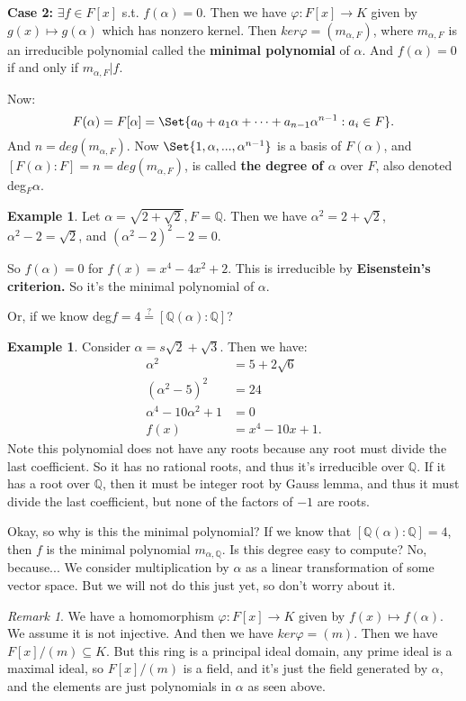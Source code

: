 \documentclass[9pt,reqno,twoside]{amsbook}
\theoremstyle{plain}
\numberwithin{section}{chapter}
\numberwithin{equation}{chapter}
\theoremstyle{definition}
\newtheorem{Ex}[theorem]{Example}
\theoremstyle{remark}
\newtheorem{rem}[theorem]{Remark}
\theoremstyle{plain}
\newcommand{\sub}{\subseteq}
\newcommand{\Q}{\mathbb{Q}}
\newcommand{\bee}{\begin{equation}\begin{aligned}}
\newcommand{\eee}{\end{aligned}\end{equation}}
\renewcommand{\phi}{\varphi}
\begin{document}
\textbf{Case 2: } $\exists f \in F[x]$ s.t. $f(\alpha) = 0$. Then we have $\phi:F[x] \to K$ given by $g(x) \mapsto g(\alpha)$ which has nonzero kernel. Then $ker\phi = (m_{\alpha,F})$, where $m_{\alpha,F}$ is an irreducible polynomial called the \textbf{minimal polynomial} of $\alpha$. And $f(\alpha) = 0$ if and only if $m_{\alpha,F}|f$. 

Now:
$$
F(\alpha) = F[\alpha] = \Set{a_0 + a_1\alpha + \cdots + a_{n - 1}\alpha^{n  -1}:a_i \in F}.
$$
And $n = deg(m_{\alpha,F})$. Now $\Set{1,\alpha,...,\alpha^{n - 1}}$ is a basis of $F(\alpha)$, and $[F(\alpha):F] = n = deg(m_{\alpha,F})$, is called \textbf{the degree of $\alpha$} over $F$, also denoted deg$_F\alpha$. 

\begin{Ex}
Let $\alpha = \sqrt{2 + \sqrt{2}}, F = \Q$. Then we have $\alpha^2 = 2 + \sqrt{2}$, $\alpha^2 - 2 = \sqrt{2}$, and $(\alpha^2 - 2)^2  - 2 = 0$. 

So $f(\alpha) = 0$ for $f(x) = x^4 - 4x^2 + 2$. This is irreducible by \textbf{Eisenstein's criterion.} So it's the minimal polynomial of $\alpha$. 

Or, if we know deg$f = 4 \overset{?}{=}[\Q(\alpha):\Q]$? 
\end{Ex}

\begin{Ex}
Consider $\alpha = s\sqrt{2} + \sqrt{3}$. Then we have:
\bee
\alpha^2 &= 5 + 2\sqrt{6}\\
(\alpha^2 - 5)^2 &= 24\\
\alpha^4 - 10 \alpha^2 + 1 &= 0\\
f(x) &= x^4 - 10x + 1.
\eee
Note this polynomial does not have any roots because any root must divide the last coefficient. So it has no rational roots, and thus it's irreducible over $\Q$. If it has a root over $\Q$, then it must be integer root  by Gauss lemma, and thus it must divide the last coefficient, but none of the factors of $-1$ are roots. 

Okay, so why is this the minimal polynomial? If we know that $[\Q(\alpha):\Q] = 4$, then $f$ is the minimal polynomial $m_{\alpha,\Q}$. Is this degree easy to compute? No, because... We consider multiplication by $\alpha$ as a linear transformation of some vector space. But we will not do this just yet, so don't worry about it. 
\end{Ex}

\begin{rem}
We have a homomorphism $\phi:F[x] \to K$ given by $f(x) \mapsto f(\alpha)$. We assume it is not injective. And then we have $ker\phi = (m)$. Then we have $F[x]/(m) \sub K$. But this ring is a principal ideal domain, any prime ideal is a maximal ideal, so $F[x]/(m)$ is a field, and it's just the field generated by $\alpha$, and the elements are just polynomials in $\alpha$ as seen above. 
\end{rem}
\end{document}
